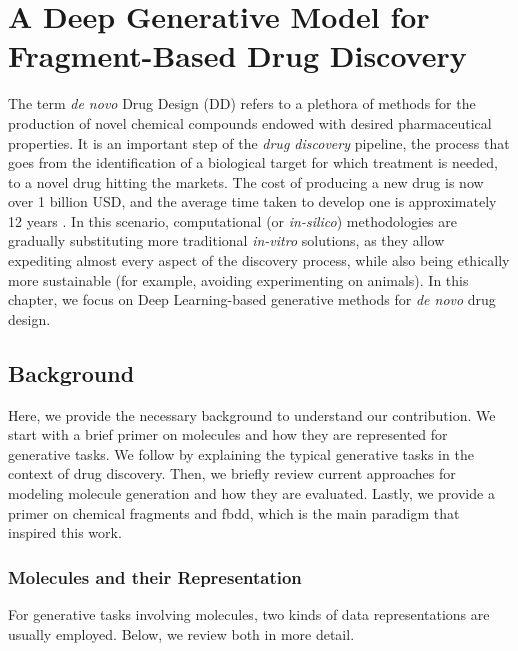 \chapter{A Deep Generative Model for Fragment-Based Drug Discovery} %
\label{ch:deep-generative-learning-drug-discovery}
The term \emph{de novo} Drug Design (DD) refers to a plethora of methods for the production of novel chemical compounds endowed with desired pharmaceutical properties. It is an important step of the \emph{drug discovery} pipeline, the process that goes from the identification of a biological target for which treatment is needed, to a novel drug hitting the markets. The cost of producing a new drug is now over 1 billion USD, and the average time taken to develop one is approximately 12 years \citep{dimasi2016drugdiscoverycost}. In this scenario, computational (or \emph{in-silico}) methodologies are gradually substituting more traditional \emph{in-vitro} solutions, as they allow expediting almost every aspect of the discovery process, while also being ethically more sustainable (for example, avoiding experimenting on animals). In this chapter, we focus on Deep Learning-based generative methods for \emph{de novo} drug design.

\section{Background}
Here, we provide the necessary background to understand our contribution. We start with a brief primer on molecules and how they are represented for generative tasks. We follow by explaining the typical generative tasks in the context of drug discovery. Then, we briefly review current approaches for modeling molecule generation and how they are evaluated. Lastly, we provide a primer on chemical fragments and \gls{fbdd}, which is the main paradigm that inspired this work.

\subsection{Molecules and their Representation}
For generative tasks involving molecules, two kinds of data representations are usually employed. Below, we review both in more detail.

